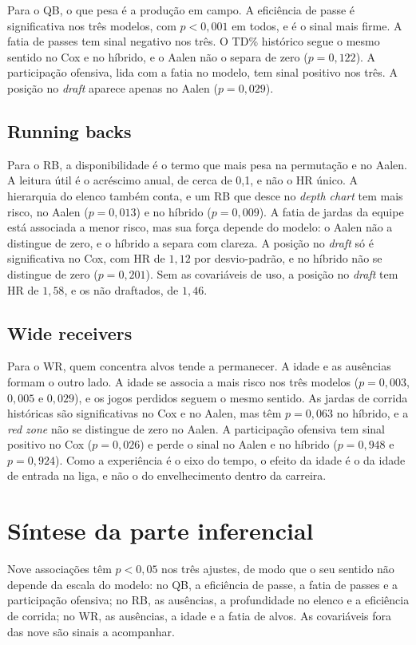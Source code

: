 Para o QB, o que pesa é a produção em campo. A eficiência de passe é significativa nos três modelos, com $p<0{,}001$ em todos, e é o sinal mais firme. A fatia de passes tem sinal negativo nos três. O TD\% histórico segue o mesmo sentido no Cox e no híbrido, e o Aalen não o separa de zero ($p=0{,}122$). A participação ofensiva, lida com a fatia no modelo, tem sinal positivo nos três. A posição no \textit{draft} aparece apenas no Aalen ($p=0{,}029$).

\subsection{Running backs}
\label{subsec:rb}

Para o RB, a disponibilidade é o termo que mais pesa na permutação e no Aalen. A leitura útil é o acréscimo anual, de cerca de 0,1, e não o HR único. A hierarquia do elenco também conta, e um RB que desce no \textit{depth chart} tem mais risco, no Aalen ($p=0{,}013$) e no híbrido ($p=0{,}009$). A fatia de jardas da equipe está associada a menor risco, mas sua força depende do modelo: o Aalen não a distingue de zero, e o híbrido a separa com clareza. A posição no \textit{draft} só é significativa no Cox, com HR de $1{,}12$ por desvio-padrão, e no híbrido não se distingue de zero ($p=0{,}201$). Sem as covariáveis de uso, a posição no \textit{draft} tem HR de $1{,}58$, e os não draftados, de $1{,}46$.

\subsection{Wide receivers}
\label{subsec:wr}

Para o WR, quem concentra alvos tende a permanecer. A idade e as ausências formam o outro lado. A idade se associa a mais risco nos três modelos ($p=0{,}003$, $0{,}005$ e $0{,}029$), e os jogos perdidos seguem o mesmo sentido. As jardas de corrida históricas são significativas no Cox e no Aalen, mas têm $p=0{,}063$ no híbrido, e a \textit{red zone} não se distingue de zero no Aalen. A participação ofensiva tem sinal positivo no Cox ($p=0{,}026$) e perde o sinal no Aalen e no híbrido ($p=0{,}948$ e $p=0{,}924$). Como a experiência é o eixo do tempo, o efeito da idade é o da idade de entrada na liga, e não o do envelhecimento dentro da carreira.

\section{Síntese da parte inferencial}
\label{sec:sintese_inferencial}

Nove associações têm $p<0{,}05$ nos três ajustes, de modo que o seu sentido não depende da escala do modelo: no QB, a eficiência de passe, a fatia de passes e a participação ofensiva; no RB, as ausências, a profundidade no elenco e a eficiência de corrida; no WR, as ausências, a idade e a fatia de alvos. As covariáveis fora das nove são sinais a acompanhar.
